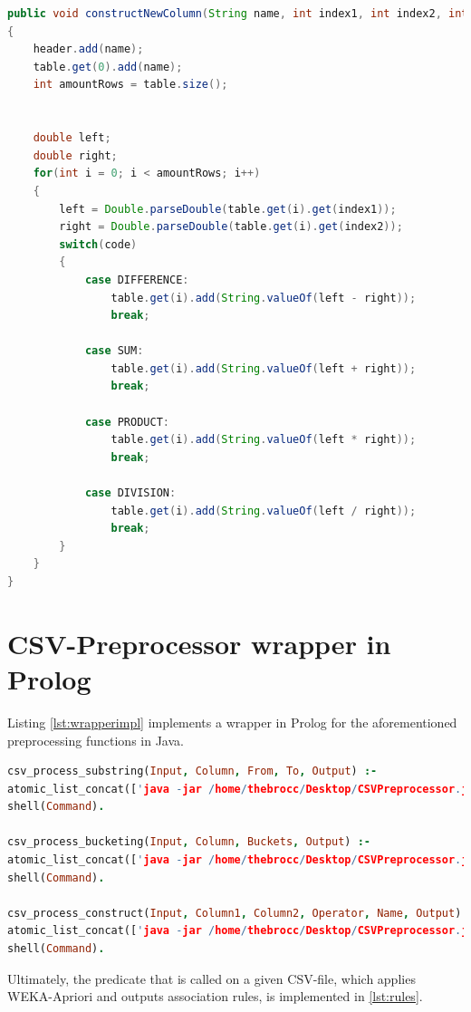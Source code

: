 \documentclass[bachelor,english]{info1thesis}
\begin{document}
	\begin{lstlisting}[language=java, caption= Implementation substringing in Preprocessor.java, label={lst:constructingimpl}]
public void constructNewColumn(String name, int index1, int index2, int code)
{
	header.add(name);
	table.get(0).add(name);
	int amountRows = table.size();


	double left;
	double right;
	for(int i = 0; i < amountRows; i++)
	{
		left = Double.parseDouble(table.get(i).get(index1));
		right = Double.parseDouble(table.get(i).get(index2));
		switch(code)
		{
			case DIFFERENCE:
				table.get(i).add(String.valueOf(left - right));
				break;

			case SUM:
				table.get(i).add(String.valueOf(left + right));
				break;

			case PRODUCT:
				table.get(i).add(String.valueOf(left * right));
				break;

			case DIVISION:
				table.get(i).add(String.valueOf(left / right));
				break;
		}
	}
}
\end{lstlisting}

\section{CSV-Preprocessor wrapper in Prolog}

Listing \ref{lst:wrapperimpl} implements a wrapper in Prolog for the aforementioned preprocessing functions in Java.

\begin{lstlisting}[language=Prolog, caption= Implementation of wrapper predicates in Prolog, label={lst:wrapperimpl}]
csv_process_substring(Input, Column, From, To, Output) :-
atomic_list_concat(['java -jar /home/thebrocc/Desktop/CSVPreprocessor.jar', Input, 'substring', Column, From, To, Output], ' ' , Command),
shell(Command).

csv_process_bucketing(Input, Column, Buckets, Output) :-
atomic_list_concat(['java -jar /home/thebrocc/Desktop/CSVPreprocessor.jar', Input, 'bucketing', Column, Buckets, Output], ' ' , Command),
shell(Command).

csv_process_construct(Input, Column1, Column2, Operator, Name, Output) :-
atomic_list_concat(['java -jar /home/thebrocc/Desktop/CSVPreprocessor.jar', Input, 'construct', Column1, Column2, Operator, Name, Output], ' ' , Command),
shell(Command).
\end{lstlisting}

Ultimately, the predicate that is called on a given CSV-file, which applies WEKA-Apriori and outputs association rules, is implemented in \ref{lst:rules}.
\end{document}
